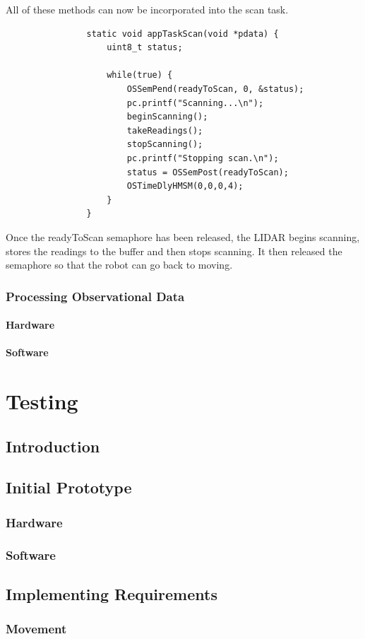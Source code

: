 				All of these methods can now be incorporated into the scan task.
				\begin{lstlisting}
				static void appTaskScan(void *pdata) {
					uint8_t status;
				
					while(true) {
						OSSemPend(readyToScan, 0, &status);
						pc.printf("Scanning...\n");
						beginScanning();
						takeReadings();
						stopScanning();
						pc.printf("Stopping scan.\n");
						status = OSSemPost(readyToScan);
						OSTimeDlyHMSM(0,0,0,4);
					}
				}
				\end{lstlisting}
				Once the readyToScan semaphore has been released, the LIDAR begins scanning, stores the readings to the buffer and then stops scanning. It then released the semaphore so that the robot can go back to moving.				
				
			\subsection{Processing Observational Data}
				\subsubsection{Hardware}
				\subsubsection{Software}
	
	
	\chapter{Testing}
		\section{Introduction}
		\section{Initial Prototype}
			\subsection{Hardware}
			\subsection{Software}
		\section{Implementing Requirements}
			\subsection{Movement}
